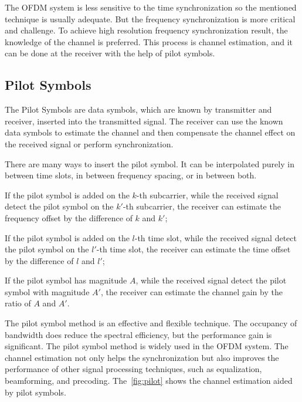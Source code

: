 The OFDM system is less sensitive to the time synchronization so the mentioned technique is usually adequate. But the frequency synchronization is more critical and challenge. To achieve high resolution frequency synchronization result, the knowledge of the channel is preferred. This process is channel estimation, and it can be done at the receiver with the help of pilot symbols.

\subsection{Pilot Symbols}
The Pilot Symbols are data symbols, which are known by transmitter and receiver, inserted into the transmitted signal. The receiver can use the known data symbols to estimate the channel and then compensate the channel effect on the received signal or perform synchronization.

There are many ways to insert the pilot symbol. It can be interpolated purely in between time slots, in between frequency spacing, or in between both.
\begin{enumerate*}[(i)]
    \item If the pilot symbol is added on the $k$-th subcarrier, while the received signal detect the pilot symbol on the $k'$-th subcarrier, the receiver can estimate the frequency offset by the difference of $k$ and $k'$;
    \item If the pilot symbol is added on the $l$-th time slot, while the received signal detect the pilot symbol on the $l'$-th time slot, the receiver can estimate the time offset by the difference of $l$ and $l'$;
    \item If the pilot symbol has magnitude $A$, while the received signal detect the pilot symbol with magnitude $A'$, the receiver can estimate the channel gain by the ratio of $A$ and $A'$.
\end{enumerate*}

The pilot symbol method is an effective and flexible technique. The occupancy of bandwidth does reduce the spectral efficiency, but the performance gain is significant. The pilot symbol method is widely used in the OFDM system. The channel estimation not only helps the synchronization but also improves the performance of other signal processing techniques, such as equalization, beamforming, and precoding. The~\cref{fig:pilot} shows the channel estimation aided by pilot symbols.

